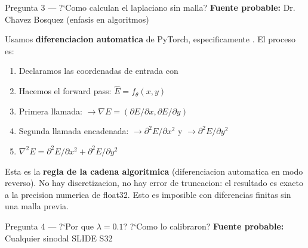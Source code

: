\vspace{8pt}

\begin{qabox}{Pregunta 3 --- ?`Como calculan el laplaciano sin malla?}
\textbf{Fuente probable:} Dr. Chavez Bosquez (enfasis en algoritmos)
\end{qabox}

\begin{answerbox}
Usamos \textbf{diferenciacion automatica} de PyTorch, especificamente
. El proceso es:

\begin{enumerate}
  \item Declaramos las coordenadas de entrada con 
  \item Hacemos el forward pass: $\hat{E} = f_\theta(x, y)$
  \item Primera llamada:  $\to \nabla E = (\partial E/\partial x, \partial E/\partial y)$
  \item Segunda llamada encadenada:
         $\to \partial^2 E/\partial x^2$
        y  $\to \partial^2 E/\partial y^2$
  \item $\nabla^2 E = \partial^2 E/\partial x^2 + \partial^2 E/\partial y^2$
\end{enumerate}

Esta es la \textbf{regla de la cadena algoritmica} (diferenciacion automatica en
modo reverso). No hay discretizacion, no hay error de truncacion: el resultado es
exacto a la precision numerica de float32. Esto es imposible con diferencias finitas
sin una malla previa.
\end{answerbox}

\vspace{8pt}

\begin{qabox}{Pregunta 4 --- ?`Por que $\lambda = 0.1$? ?`Como lo calibraron?}
\textbf{Fuente probable:} Cualquier sinodal \quad \colorbox{ujatred!20}{\small SLIDE S32}
\end{qabox}

